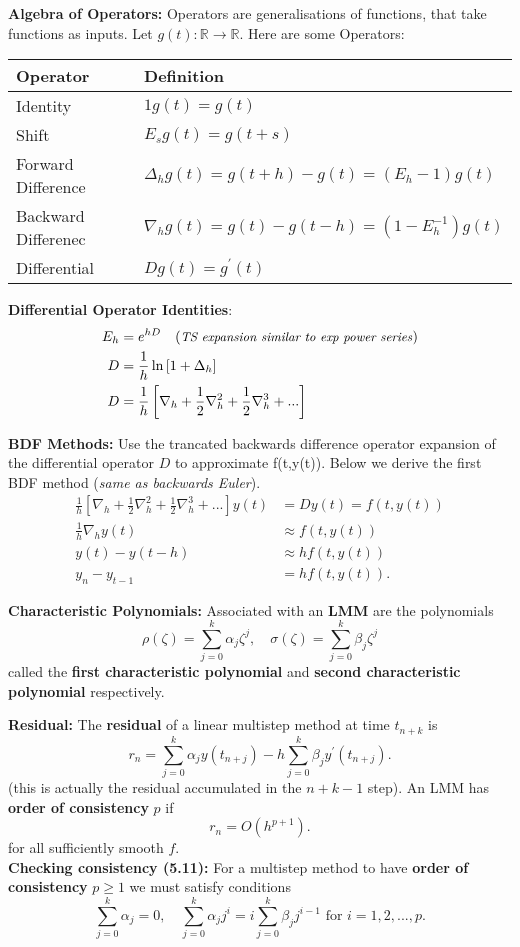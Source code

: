 \documentclass[10pt,a4paper]{article}
\newcommand{\R}{\mathbb{R}}
\begin{document}
\begin{multicols*}{2}
\textbf{Algebra of Operators:} Operators are generalisations of functions, that take functions as inputs. Let $g(t): \R \to \R$. Here are some Operators:

\begin{tabular}{l | l}
     \textbf{Operator}   & \textbf{Definition} \\
     \hline
     Identity            & $1 g(t) = g(t)$ \\
     Shift               & $E_sg(t) = g(t + s)$ \\
     Forward Difference  & $\Delta_hg(t) = g(t + h) - g(t) = (E_h - 1)g(t)$ \\
     Backward Differenec & $\nabla_hg(t) = g(t) - g(t - h) = (1 - E_h^{-1})g(t)$ \\
     Differential        & $Dg(t) = g^\prime(t)$
\end{tabular}

\textbf{Differential Operator Identities}:
\begin{align*}
    E_h &= e^{hD}\quad \small(\text{\textit{TS expansion similar to exp power series}})\normalsize\\
    D   &= \frac{1}{h}\ln\left[1 + \Delta_h\right]\\
    D   &= \frac{1}{h}\left[\nabla_h + \frac{1}{2}\nabla_h^2 + \frac{1}{2}\nabla_h^3 + ... \right]\\
\end{align*}

\textbf{BDF Methods:} Use the trancated backwards difference operator expansion of the differential operator $D$ to approximate f(t,y(t)). Below we derive the first BDF method (\textit{same as backwards Euler}).
\begin{align*}
    \frac{1}{h}\left[\nabla_h + \frac{1}{2}\nabla_h^2 + \frac{1}{2}\nabla_h^3 + ... \right]y(t) &= Dy(t) = f(t,y(t))\\
    \frac{1}{h}\nabla_h y(t) &\approx f(t,y(t))\\
    y(t) - y(t - h) &\approx hf(t,y(t))\\
    y_n - y_{t-1} &= hf(t, y(t)).
\end{align*}

\textbf{Characteristic Polynomials:} Associated with an \textbf{LMM} are the polynomials
\[
\rho(\zeta) = \sum_{j=0}^k \alpha_j \zeta^j, \quad \sigma(\zeta) = \sum_{j=0}^k \beta_j\zeta^j    
\]
called the \textbf{first characteristic polynomial} and \textbf{second characteristic polynomial} respectively.

\textbf{Residual:} The \textbf{residual} of a linear multistep method at time $t_{n+k}$ is 
\[
r_n = \sum_{j=0}^k \alpha_jy(t_{n+j}) - h\sum_{j=0}^k\beta_jy^\prime(t_{n+j}).
\] 
\small(this is actually the residual accumulated in the $n + k - 1$ step)\normalsize. An LMM has \textbf{order of consistency} $p$ if 
\[
r_n = O(h^{p+1}).    
\]
for all sufficiently smooth $f$.\\
\textbf{Checking consistency (5.11):} For a multistep method to have \textbf{order of consistency} $p \geq 1$ we must satisfy conditions
\[
    \sum_{j = 0}^k {\alpha_j} = 0, \quad \sum_{j=0}^k \alpha_jj^i = i\sum_{j=0}^k \beta_jj^{i-1} \text{ for } i = 1,2,...,p.
\]


\end{multicols*}
\end{document}
